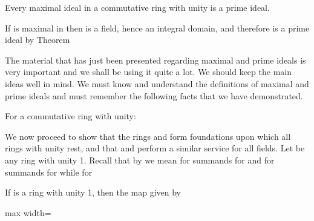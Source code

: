 \documentclass[11pt,oneside]{article}
\begin{document}
\BookNarrativetrue

\begin{BookBody}

 Every maximal ideal in a commutative ring  with unity is a prime ideal.

 If  is maximal in  then  is a field, hence an integral domain, and therefore  is a prime ideal by Theorem \BookEnd{\blacklozenge}

The material that has just been presented regarding maximal and prime ideals is very important and we shall be using it quite a lot. We should keep the main ideas well in mind. We must know and understand the definitions of maximal and prime ideals and must remember the following facts that we have demonstrated.

For a commutative ring  with unity:





\noindent We now proceed to show that the rings  and  form foundations upon which all rings with unity rest, and that  and  perform a similar service for all fields. Let  be any ring with unity 1. Recall that by  we mean  for  summands for  and  for  summands for  while  for 

 If  is a ring with unity 1, then the map  given by

\begin{center}\begin{adjustbox}{max width=\linewidth}\end{adjustbox}\end{center}


\end{BookBody}
\end{document}
